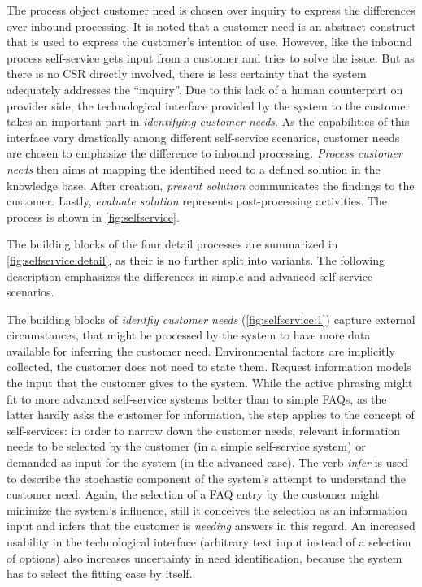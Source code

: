 	The process object customer need is chosen over inquiry to express the differences over inbound processing. It is noted that a customer need is an abstract construct that is used to express the customer's intention of use. However, like the inbound process self-service gets input from a customer and tries to solve the issue. But as there is no \acrshort{CSR} directly involved, there is less certainty that the system adequately addresses the \enquote{inquiry}. Due to this lack of a human counterpart on provider side, the technological interface provided by the system to the customer takes an important part in \textit{identifying customer needs}. As the capabilities of this interface vary drastically among different self-service scenarios, customer needs are chosen to emphasize the difference to inbound processing. \textit{Process customer needs} then aims at mapping the identified need to a defined solution in the knowledge base. After creation, \textit{present solution} communicates the findings to the customer. Lastly, \textit{evaluate solution} represents post-processing activities. The process is shown in \Fig \ref{fig:selfservice}.
	
	The building blocks of the four detail processes are summarized in \Fig \ref{fig:selfservice:detail}, as their is no further split into variants. The following description emphasizes the differences in simple and advanced self-service scenarios. 
	
	The building blocks of \textit{identfiy customer needs} (\Fig \ref{fig:selfservice:1}) capture external circumstances, that might be processed by the system to have more data available for inferring the customer need. Environmental factors are implicitly collected, \ie the customer does not need to state them. Request information models the input that the customer gives to the system. While the active phrasing might fit to more advanced self-service systems better than to simple \acrshort{FAQ}s, as the latter hardly asks the customer for information, the step applies to the concept of self-services: in order to narrow down the customer needs, relevant information needs to be selected by the customer (in a simple self-service system) or demanded as input for the system (in the advanced case). The verb \textit{infer} is used to describe the stochastic component of the system's attempt to understand the customer need. Again, the selection of a \acrshort{FAQ} entry by the customer might minimize the system's influence, still it conceives the selection as an information input and infers that the customer is \textit{needing} answers in this regard. An increased usability in the technological interface (arbitrary text input instead of a selection of options) also increases uncertainty in need identification, because the system has to select the fitting case by itself. 
	
